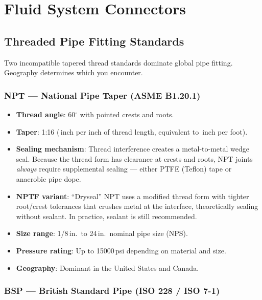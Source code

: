 \documentclass[11pt,letterpaper,twoside,openany]{book}
\providecommand{\ang}[1]{#1\ensuremath{{}^{\circ}}}
\begin{document}
\FloatBarrier
\section{Fluid System Connectors}

\subsection{Threaded Pipe Fitting Standards}

Two incompatible tapered thread standards dominate global pipe fitting. Geography determines which you encounter.

\subsubsection{NPT --- National Pipe Taper (ASME B1.20.1)}

\begin{itemize}[leftmargin=1.5em]
  \item \textbf{Thread angle}: \ang{60} with pointed crests and roots.
  \item \textbf{Taper}: 1:16 (\textonequarter\,inch per inch of thread length, equivalent to \textthreequarters\,inch per foot).
  \item \textbf{Sealing mechanism}: Thread interference creates a metal-to-metal wedge seal. Because the thread form has clearance at crests and roots, NPT joints \emph{always} require supplemental sealing --- either PTFE (Teflon) tape or anaerobic pipe dope.
  \item \textbf{NPTF variant}: ``Dryseal'' NPT uses a modified thread form with tighter root/crest tolerances that crushes metal at the interface, theoretically sealing without sealant. In practice, sealant is still recommended.
  \item \textbf{Size range}: 1/8\,in.\ to 24\,in.\ nominal pipe size (NPS).
  \item \textbf{Pressure rating}: Up to 15000\,psi depending on material and size.
  \item \textbf{Geography}: Dominant in the United States and Canada.
\end{itemize}

\subsubsection{BSP --- British Standard Pipe (ISO 228 / ISO 7-1)}
\end{document}

